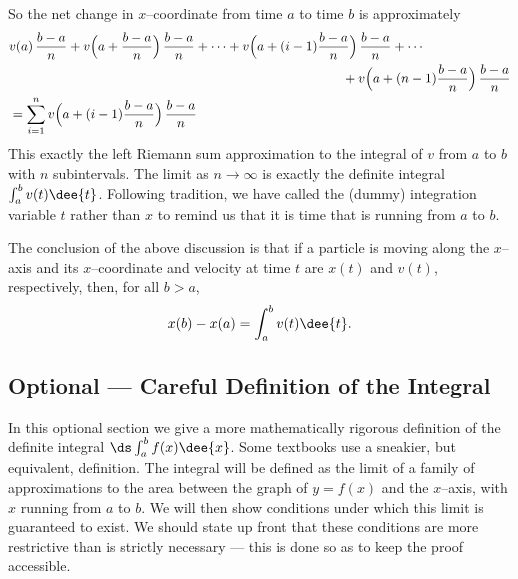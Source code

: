 \begin{eg}
\begin{itemize}
\end{itemize}
So the net change in $x$--coordinate from time $a$ to time $b$ is approximately
\begin{align*}
&v(a)\,\frac{b-a}{n} + v\Big(a+\frac{b-a}{n}\Big)\,\frac{b-a}{n} +\cdots
+v\Big(a+(i-1)\frac{b-a}{n}\Big)\,\frac{b-a}{n} + \cdots \\
&\hskip3.5in
+v\Big(a+(n-1)\frac{b-a}{n}\Big)\,\frac{b-a}{n} \\
&= \sum_{i=1}^n v\Big(a+(i-1)\frac{b-a}{n}\Big)\,\frac{b-a}{n}
\end{align*}
This exactly the left Riemann sum approximation to the integral of $v$
from $a$ to $b$ with $n$ subintervals. The limit as $n\rightarrow\infty$
is exactly the definite integral $\int_a^b v(t)\dee{t}$. Following tradition,
we have called the (dummy) integration variable $t$ rather than $x$ to
remind us that it is time that is running from $a$ to $b$.

The conclusion of the above discussion is that if a particle is moving
along the $x$--axis and its $x$--coordinate and velocity at time $t$ are
$x(t)$ and $v(t)$, respectively, then, for all $b>a$,
\begin{align*}
x(b)  - x(a) = \int_a^b v(t)\dee{t}.
\end{align*}

\end{eg}



\subsection{Optional --- Careful Definition of the Integral}\label{ssec
careful defn}
In this optional section we give a more mathematically rigorous definition of
the definite
integral $\ds \int_a^b f(x)\dee{x}$. Some textbooks use a sneakier, but
equivalent,
definition. The integral will be defined as the limit of a family of
approximations to the
area between the graph of $y=f(x)$ and the $x$--axis, with $x$ running from $a$
to $b$.
We will then show conditions under which this limit is guaranteed to exist. We
should
state up front that these conditions are more restrictive than is strictly
necessary ---
this is done so as to keep the proof accessible.

